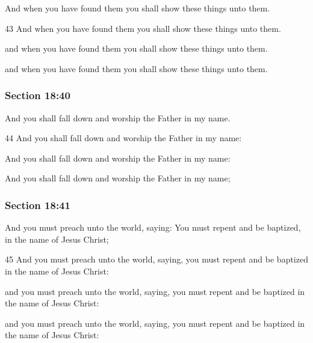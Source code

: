 		And when you have found them you shall show these things unto them.

		\begin{framed}
		\scriptsize
			\begin{compactdesc}
				\item[JSP] 43 And when you have found them you shall show these things unto them.
				\item[DC 1835] and when you have found them you shall show these things unto them. 
				\item[DC 1844] and when you have found them you shall show these things unto them. 
			\end{compactdesc}
		\end{framed}

	\subsubsection{Section 18:40} %
		\label{DC18-40}

		And you shall fall down and worship the Father in my name.

		\begin{framed}
		\scriptsize
			\begin{compactdesc}
				\item[JSP] 44 And you shall fall down and worship the Father in my name:
				\item[DC 1835] And you shall fall down and worship the Father in my name: 
				\item[DC 1844] And you shall fall down and worship the Father in my name; 
			\end{compactdesc}
		\end{framed}

	\subsubsection{Section 18:41} %
		\label{DC18-41}

		And you must preach unto the world, saying: You must repent and be baptized, in the name of Jesus Christ;

		\begin{framed}
		\scriptsize
			\begin{compactdesc}
				\item[JSP] 45 And you must preach unto the world, saying, you must repent and be baptized in the name of Jesus Christ:
				\item[DC 1835] and you must preach unto the world, saying, you must repent and be baptized in the name of Jesus Christ: 
				\item[DC 1844] and you must preach unto the world, saying, you must repent and be baptized in the name of Jesus Christ: 
			\end{compactdesc}
		\end{framed}

